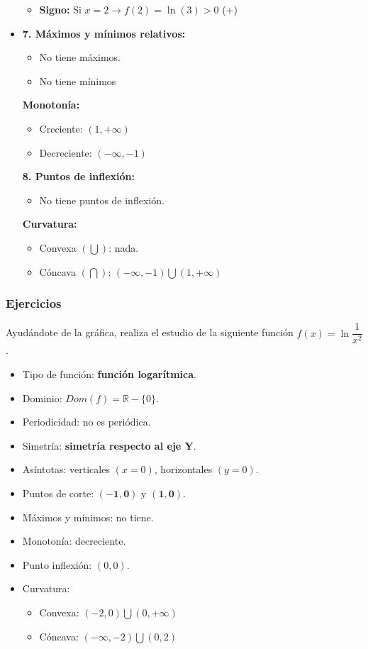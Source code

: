\begin{itemize}
\begin{itemize}
		\item \textbf{Signo: }Si $x=2 \rightarrow f(2)=\ln(3)>0$ (+)
	\end{itemize}
	\item \textbf{7. Máximos y mínimos relativos: }\\
	\begin{itemize}
		\item No tiene máximos.
		\item No tiene mínimos
	\end{itemize}
	\textbf{Monotonía: }\\
	\begin{itemize}
		\item Creciente: $(1, +\infty)$
		\item Decreciente: $(-\infty, -1)$
	\end{itemize}
	\textbf{8. Puntos de inflexión: }\\
	\begin{itemize}
		\item No tiene puntos de inflexión.
	\end{itemize}
	\textbf{Curvatura: }\\
	\begin{itemize}
		\item Convexa $(\bigcup)$: nada.
		\item Cóncava $(\bigcap)$: $(-\infty, -1) \bigcup (1, +\infty)$
	\end{itemize}
\end{itemize}
\subsubsection{Ejercicios}
\begin{ex}
	Ayudándote de la gráfica, realiza el estudio de la siguiente función $f(x)= \ln {\dfrac{1}{x^2}}$.
	\begin{sol}
		\begin{itemize}
			\item Tipo de función: \textbf{función logarítmica}.
			\item Dominio: $Dom(f) = \mathbb{R} - \{0\}$.
			\item Periodicidad: no es periódica.
			\item Simetría: \textbf{simetría respecto al eje Y}.
			\item Asíntotas: verticales $(x=0)$, horizontales $(y=0)$.
			\item Puntos de corte: $\mathbf{(-1,0)}$ y $\mathbf{(1,0)}$.
			\item Máximos y mínimos: no tiene.
			\item Monotonía: decreciente.
			\item Punto inflexión: $(0,0)$.
			\item Curvatura:
			\begin{itemize}
				\item Convexa: $(-2,0) \bigcup (0,+\infty)$
				\item Cóncava: $(-\infty, -2) \bigcup (0,2)$
			\end{itemize}
		\end{itemize}
	\end{sol}
\end{ex}
